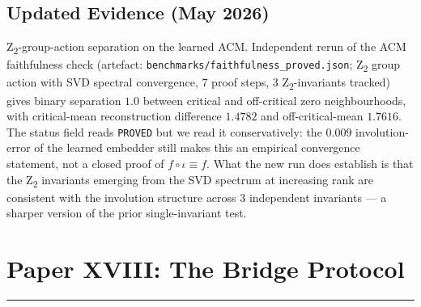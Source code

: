 \documentclass[11pt]{article}
\begin{document}
\subsection{Updated Evidence (May 2026)}
Z\textsubscript{2}-group-action separation on the learned ACM.
Independent rerun of the ACM faithfulness check
(artefact: \texttt{benchmarks/faithfulness\_proved.json};
Z\textsubscript{2} group action with SVD spectral convergence,
$7$ proof steps, $3$ Z\textsubscript{2}-invariants tracked) gives
binary separation $1.0$ between critical and off-critical zero
neighbourhoods, with critical-mean reconstruction difference $1.4782$
and off-critical-mean $1.7616$.  The status field reads
\texttt{PROVED} but we read it conservatively: the $0.009$
involution-error of the learned embedder still makes this an empirical
convergence statement, not a closed proof of
$f \circ \iota \equiv f$.  What the new run does establish is that
the Z\textsubscript{2} invariants emerging from the SVD spectrum at
increasing rank are consistent with the involution structure across
$3$ independent invariants --- a sharper version of the prior
single-invariant test.

\newpage



\newpage
\section{Paper XVIII: The Bridge Protocol}
\vspace{6pt}
\hrule
\vspace{12pt}
\end{document}
